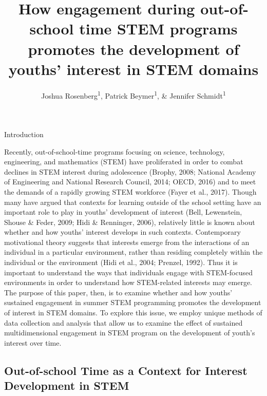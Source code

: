 \documentclass[man]{apa6}
\title{How engagement during out-of-school time STEM programs promotes the
development of youths' interest in STEM domains}
\author{Joshua Rosenberg\textsuperscript{1}, Patrick Beymer\textsuperscript{1}, \& Jennifer Schmidt\textsuperscript{1}}
\affiliation{
    \vspace{0.5cm}
          \textsuperscript{1} Michigan State University  }
\theoremstyle{definition}
\theoremstyle{definition}
\theoremstyle{definition}
\theoremstyle{remark}
\begin{document}
\maketitle

\setcounter{secnumdepth}{0}



Introduction

Recently, out-of-school-time programs focusing on science, technology,
engineering, and mathematics (STEM) have proliferated in order to combat
declines in STEM interest during adolescence (Brophy, 2008; National
Academy of Engineering and National Research Council, 2014; OECD, 2016)
and to meet the demands of a rapidly growing STEM workforce (Fayer et
al., 2017). Though many have argued that contexts for learning outside
of the school setting have an important role to play in youths'
development of interest (Bell, Lewenstein, Shouse \& Feder, 2009; Hidi
\& Renninger, 2006), relatively little is known about whether and how
youths' interest develops in such contexts. Contemporary motivational
theory suggests that interests emerge from the interactions of an
individual in a particular environment, rather than residing completely
within the individual or the environment (Hidi et al., 2004; Prenzel,
1992). Thus it is important to understand the ways that individuals
engage with STEM-focused environments in order to understand how
STEM-related interests may emerge. The purpose of this paper, then, is
to examine whether and how youths' sustained engagement in summer STEM
programming promotes the development of interest in STEM domains. To
explore this issue, we employ unique methods of data collection and
analysis that allow us to examine the effect of sustained
multidimensional engagement in STEM program on the development of
youth's interest over time.

\subsection{Out-of-school Time as a Context for Interest Development in
STEM}\label{out-of-school-time-as-a-context-for-interest-development-in-stem}
\end{document}
